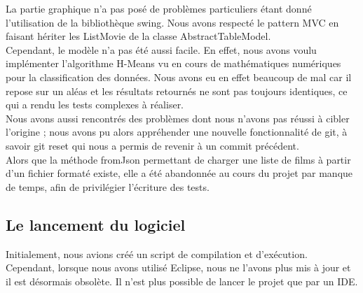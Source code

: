 La partie graphique n'a pas posé de problèmes particuliers étant donné l'utilisation de la bibliothèque swing. Nous avons respecté le pattern MVC en faisant hériter les ListMovie de la classe AbstractTableModel. \\
Cependant, le modèle n'a pas été aussi facile. En effet, nous avons voulu implémenter l'algorithme H-Means vu en cours de mathématiques numériques pour la classification des données. Nous avons eu en effet beaucoup de mal car il repose sur un aléas et les résultats retournés ne sont pas toujours identiques, ce qui a rendu les tests complexes à réaliser. \\
Nous avons aussi rencontrés des problèmes dont nous n'avons pas réussi à cibler l'origine ; nous avons pu alors appréhender une nouvelle fonctionnalité de git, à savoir git reset qui nous a permis de revenir à un commit précédent. \\
Alors que la méthode fromJson permettant de charger une liste de films à partir d'un fichier formaté existe, elle a été abandonnée au cours du projet par manque de temps, afin de privilégier l'écriture des tests.

\subsection{Le lancement du logiciel}
Initialement, nous avions créé un script de compilation et d'exécution. Cependant, lorsque nous avons utilisé Eclipse, nous ne l'avons plus mis à jour et il est désormais obsolète. Il n'est plus possible de lancer le projet que par un IDE.